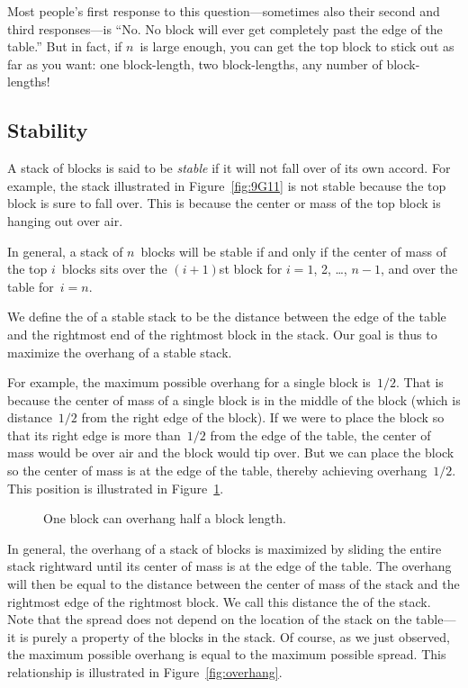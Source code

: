 Most people's first response to this question---sometimes also their
second and third responses---is ``No. No block will ever get
completely past the edge of the table.''  But in fact, if $n$~is large
enough, you can get the top block to stick out as far as you want: one
block-length, two block-lengths, any number of block-lengths!

\subsection{Stability}\label{sec:stability}

A stack of blocks is said to be \emph{stable} if it will not fall over
of its own accord.  For example, the stack illustrated in
Figure~\ref{fig:9G11} is not stable because the top block is sure to
fall over.  This is because the center or mass of the top block is
hanging out over air.

In general, a stack of $n$~blocks will be stable if and only if the
center of mass of the top $i$~blocks sits over the $(i + 1)$st block
for $i = 1$, 2, \dots, $n - 1$, and over the table for~$i = n$.

We define the  of a stable stack to be the distance
between the edge of the table and the rightmost end of the rightmost
block in the stack.  Our goal is thus to maximize the overhang of a
stable stack.

For example, the maximum possible overhang for a single block
is~$1/2$.  That is because the center of mass of a single block is in
the middle of the block (which is distance~$1/2$ from the right edge
of the block).  If we were to place the block so that its right edge
is more than~$1/2$ from the edge of the table, the center of mass
would be over air and the block would tip over.  But we can place the
block so the center of mass is at the edge of the table, thereby
achieving overhang~$1/2$.  This position is illustrated in
Figure~\ref{fig:one-stable-block}.

\begin{figure}


\caption{One block can overhang half a block length.}

\label{fig:one-stable-block}

\end{figure}

In general, the overhang of a stack of blocks is maximized by sliding
the entire stack rightward until its center of mass is at the edge of
the table.  The overhang will then be equal to the distance between
the center of mass of the stack and the rightmost edge of the
rightmost block.  We call this distance the  of the
stack.  Note that the spread does not depend on the location of the
stack on the table---it is purely a property of the blocks in the
stack.  Of course, as we just observed, the maximum possible overhang
is equal to the maximum possible spread.  This relationship is
illustrated in Figure~\ref{fig:overhang}.

